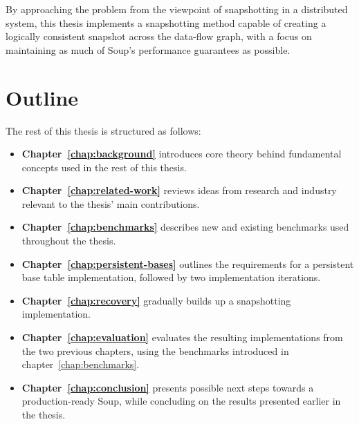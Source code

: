 By approaching the problem from the viewpoint of snapshotting in a distributed
system, this thesis implements a snapshotting method capable of creating a
logically consistent snapshot across the data-flow graph, with a focus on
maintaining as much of Soup's performance guarantees as possible.

\section{Outline}

The rest of this thesis is structured as follows:

\begin{itemize}
  \item \textbf{Chapter~\ref{chap:background}} introduces core theory behind fundamental
  concepts used in the rest of this thesis.
  \item \textbf{Chapter~\ref{chap:related-work}} reviews ideas from research and
  industry relevant to the thesis' main contributions.
  \item \textbf{Chapter~\ref{chap:benchmarks}} describes new and existing
  benchmarks used throughout the thesis.
  \item \textbf{Chapter~\ref{chap:persistent-bases}} outlines the requirements
  for a persistent base table implementation, followed by two implementation
  iterations.
  \item \textbf{Chapter~\ref{chap:recovery}} gradually builds up a snapshotting
  implementation.
  \item \textbf{Chapter~\ref{chap:evaluation}} evaluates the resulting
  implementations from the two previous chapters, using the benchmarks
  introduced in chapter~\ref{chap:benchmarks}.
  \item \textbf{Chapter~\ref{chap:conclusion}} presents possible next steps
  towards a production-ready Soup, while concluding on the results presented
  earlier in the thesis.
\end{itemize}

